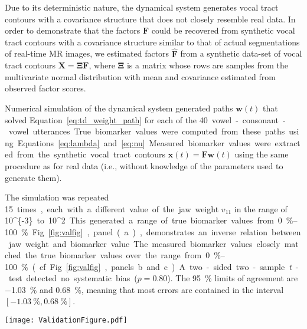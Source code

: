 \documentclass[reprint]{JASAnew}\usepackage[]{graphicx}\usepackage[]{color}
\begin{document}
Due to its deterministic nature, the dynamical system generates vocal tract contours with a covariance structure that does not closely resemble real data. In order to demonstrate that the factors $\mathbf{F}$ could be recovered from synthetic vocal tract contours with a covariance structure similar to that of actual segmentations of real-time MR images, we estimated factors $\mathbf{\hat{F}}$ from a synthetic data-set of vocal tract contours $\mathbf{X} = \boldsymbol{\Xi}\mathbf{F}$, where $\boldsymbol{\Xi}$ is a matrix whose rows are samples from the multivariate normal distribution with mean and covariance estimated from observed factor scores. 

Numerical simulation of the dynamical system generated paths $\mathbf{w}(t)$ that solved Equation~\ref{eq:td_weight_path} for each of the \SI{40} vowel-consonant-vowel utterances. True biomarker values were computed from these paths using Equations~\ref{eq:lambda} and~\ref{eq:nu}. Measured biomarker values were extracted from the synthetic vocal tract contours $\mathbf{x}(t) = \mathbf{F}\mathbf{w}(t)$ using the same procedure as for real data (i.e., without knowledge of the parameters used to generate them). 

The simulation was repeated \SI{15} times, each with a different value of the jaw weight $v_{11}$ in the range of \SI[parse-numbers=false]{10^{-3}} to \SI[parse-numbers=false]{10^2}. This generated a range of true biomarker values from \SIrange{0}{100}{\percent}. Fig.~\ref{fig:valfig}, panel (a), demonstrates an inverse relation between jaw weight and biomarker value. The measured biomarker values closely matched the true biomarker values over the range from~\SIrange{0}{100}{\percent} (cf. Fig.~\ref{fig:valfig}, panels b and c). A two-sided two-sample {\it t}-test detected no systematic bias ($p = 0.80$). The \SI{95}{\percent} limits of agreement are \SI{-1.03}{\percent} and \SI{0.68}{\percent}, meaning that most errors are contained in the interval $[\SI{-1.03}{\percent},\SI{0.68}{\percent}]$.

\begin{figure*}
\centering
\texttt{[image: ValidationFigure.pdf]}
\caption{{\bf a.} Relationship between measured biomarker values and theoretical jaw weight parameter values. The jaw weight parameter controls jaw usage in the dynamical systems simulation of vocal tract movement. Large biomarker values close to \SI{100}{\percent} correspond to small jaw weight parameters (indicating great jaw usage). Small biomarker values close to \SI{0}{\percent} correspond to large jaw weight parameters (indicating little jaw usage).
{\bf b.} Relationship between the true and measured biomarker values. True values were obtained from synthetic data generated in a dynamical systems simulation.
{\bf c.} Relationship between the true and measured biomarker values. True values were obtained from synthetic data generated in a dynamical systems simulation. \SI{95}{\percent} of the measured biomarker values differed from the true value by \SIrange{-1.4}{0.91}{\percent}. The measurement bias was~\SI{-0.25}{\percent}.}
\label{fig:valfig}
\end{figure*}
\end{document}
